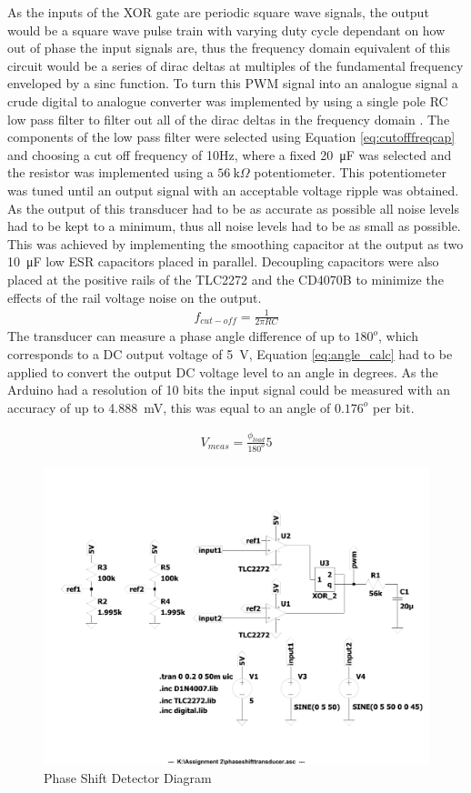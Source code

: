 As the inputs of the XOR gate are periodic square wave signals, the output would be a square wave pulse train with varying duty cycle dependant on how out of phase the input signals are, thus the frequency domain equivalent of this circuit would be a series of dirac deltas at multiples of the fundamental frequency enveloped by a sinc function. To turn this PWM signal into an analogue signal a crude digital to analogue converter was implemented by using a single pole RC low pass filter to filter out all of the dirac deltas in the frequency domain \cite{PWMref}. The components of the low pass filter were selected using Equation \ref{eq:cutofffreqcap} and choosing a cut off frequency of 10Hz, where a fixed \SI{20}{\micro F} was selected and the resistor was implemented using a $\SI{56}{\kilo \Omega}$ potentiometer. This potentiometer was tuned until an output signal with an acceptable voltage ripple was obtained. As the output of this transducer had to be as accurate as possible all noise levels had to be kept to a minimum, thus all noise levels had to be as small as possible. This was achieved by implementing the smoothing capacitor at the output as two \SI{10}{\micro F} low ESR capacitors placed in parallel. Decoupling capacitors were also placed at the positive rails of the TLC2272 and the CD4070B to minimize the effects of the rail voltage noise on the output.
\begin{align}
    f_{cut-off}=\frac{1}{2\pi RC} 
   \label{eq:cutofffreqcap}
\end{align}
The transducer can measure a phase angle difference of up to $180^o$, which corresponds to a DC output voltage of \SI{5}{\volt}, Equation \ref{eq:angle_calc} had to be applied to convert the output DC voltage level to an angle in degrees. As the Arduino had a resolution of 10 bits the input signal could be measured with an accuracy of up to \SI{4.888}{\milli V}, this was equal to an angle of $0.176^o$ per bit.

\begin{align}
    V_{meas} =\frac{\phi_{load}}{180^o} 5
   \label{eq:angle_calc}
\end{align}

\begin{figure}[h!]
    \centering
    \includegraphics[width = 0.65\linewidth]{Figures/phaseshifttransducer.pdf}
        \caption{Phase Shift Detector Diagram}
    \label{fig:phaseshiftdetector.pdf}
\end{figure}

